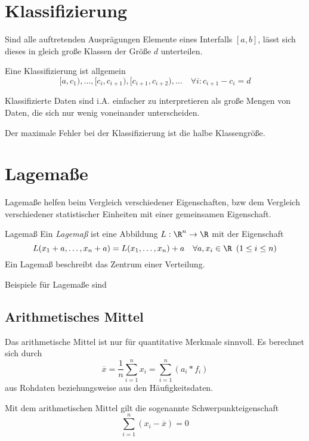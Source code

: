 \section{Klassifizierung}
Sind alle auftretenden Ausprägungen Elemente eines Interfalls $[a,b]$, lässt sich dieses in gleich große Klassen der Größe $d$ unterteilen.

Eine Klassifizierung ist allgemein
\begin{equation*}
	[a, c_1), \ldots, [c_i,c_{i+1}), [c_{i+1},c_{i+2}), \ldots\quad \forall i: c_{i+1}-c_i=d
\end{equation*}

Klassifizierte Daten sind i.A. einfacher zu interpretieren als große Mengen von Daten, die sich nur wenig voneinander unterscheiden.

Der maximale Fehler bei der Klassifizierung ist die halbe Klassengröße.

\section{Lagemaße}
Lagemaße helfen beim Vergleich verschiedener Eigenschaften, bzw dem Vergleich verschiedener statistischer Einheiten mit einer gemeinsamen Eigenschaft. 

\begin{definition}{Lagemaß}
	Ein \emph{Lagemaß} ist eine Abbildung $L:\R^n\rightarrow \R$ mit der Eigenschaft
	\begin{equation*}
		L(x_1+a,\ldots,x_n+a)=L(x_1,\ldots,x_n)+a\quad \forall a,x_i\in\R\enspace (1\leq i\leq n)
	\end{equation*}
	Ein Lagemaß beschreibt das Zentrum einer Verteilung.
\end{definition}

Beispiele für Lagemaße sind

\subsection{Arithmetisches Mittel}
Das arithmetische Mittel ist nur für quantitative Merkmale sinnvoll. Es berechnet sich durch
\begin{equation*}
    \overline x=\frac 1n \sum\limits_{i=1}^n x_i=\sum\limits_{i=1}^n (a_i*f_i)
\end{equation*}
aus Rohdaten beziehungsweise aus den Häufigkeitsdaten.

Mit dem arithmetischen Mittel gilt die sogenannte Schwerpunkteigenschaft
\begin{equation*}
	\sum\limits_{i=1}^n(x_i-\overline x)=0
\end{equation*}

